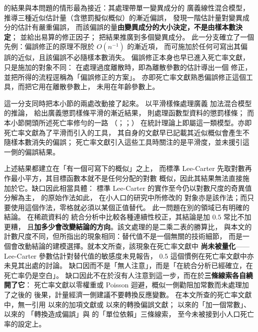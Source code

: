 \documentclass[UTF8, fontset=macnew, a4paper, 12pt]{ctexart}
\begin{document}
\citet{breslow1995} 的結果與本問題的情形最為接近：其處理帶單一變異成分的
廣義線性混合模型，推導三種近似估計量（含懲罰擬似概似）的漸近偏誤，
發現一階估計量對變異成分的估計有嚴重偏誤，
而該偏誤的量\textbf{由變異成分的大小決定，不是由樣本數決定}；
並給出易算的修正因子；\citet{linbreslow1996} 把結果推廣到多個變異成分。
此一分支確立了一個先例：偏誤修正的原理不限於 $O(n^{-1})$ 的漸近項，
而可施加於任何可寫出其偏誤的近似，且該偏誤不必隨樣本數消失。
偏誤修正本身也早已進入死亡率文獻，只是施加的對象不同：
\citet[\S4]{djeundje2010} 在處理過度離散時，即為離散參數的估計導出一個
修正，並把所得的流程逕稱為「偏誤修正的方案」。
亦即死亡率文獻熟悉偏誤修正這個工具，而把它用在離散參數上，
未用在年齡參數上。

這一分支同時把本小節的兩處改動接了起來。\citet{lin1999} 以平滑樣條處理廣義
加法混合模型的推論，\citet{kauermann2009} 給出廣義懲罰樣條平滑的漸近結果，
\citet{xiao2020} 則處理函數型資料的懲罰樣條；
而本小節開頭所述死亡率修勻的一路
（\citealp{currie2004}；\citealp{delwarde2007}；\citealp{currie2013}）
在統計理論上即屬這一類模型。亦即死亡率文獻為了平滑而引入的工具，
其自身的文獻早已記載其近似概似會產生不隨樣本數消失的偏誤；
死亡率文獻引入這些工具時關注的是平滑度，並未援引這一側的偏誤結果。

上述結果都建立在「有一個可寫下的概似」之上，
而標準 Lee-Carter 先取對數再作最小平方，其目標函數本就不是任何分配的對數
概似，因此其結果無法直接施加於它。缺口因此相當具體：
標準 Lee-Carter 的實作至今仍以對數尺度的奇異值分解為主，
\citet{lee1992} 的原始作法如此，\citet{yue2019} 在小人口的研究中所修改的
對象亦是該作法；而只要使用這個作法，零格就必須以某個正值替代。
此一問題在別的領域已有明確的結論。\citet{sweeting2004} 在稀疏資料的
統合分析中比較各種連續性校正，其結論是加 $0.5$ 常比不加更糟，
且\textbf{加多少會改變結論的方向}。該文處理的是二乘二表的勝算比，
與本文的計數尺度不同，但所指出的現象相同：替代值不是一個無關的技術細節，
而是一個會改動結論的建模選擇。就本文所查，該現象在死亡率文獻中
\textbf{尚未被量化}——Lee-Carter 參數估計對替代值的敏感度未見報告，
$0.5$ 這個慣例在死亡率文獻中亦未見其出處的討論。
缺口因而不是「無人注意」，而是「在統合分析已經確立，在死亡率仍是空白」。
缺口因此不在於沒有人注意到這一步，而在於\textbf{三條線索各自繞開了它}：
死亡率文獻以零權重或 Poisson 迴避，概似一側勸阻加常數而未處理加了之後的
後果，計量經濟一側建議不要轉換反應變數。
在本文所查的死亡率文獻中，無一引用 \citet{haldane1956} 以來的加項文獻或
\citet{duan1983} 以來的轉換偏誤文獻；
\citet{haldane1956} 以來的「加一個常數」、\citet{duan1983} 以來的
「轉換造成偏誤」與 \citet{chenroth2024} 的「單位依賴」三條線索，
至今未被接到小人口死亡率的設定上。
\end{document}
